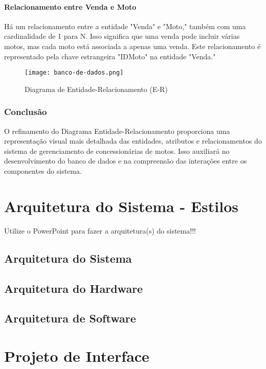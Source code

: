 \paragraph{Relacionamento entre Venda e Moto}

Há um relacionamento entre a entidade "Venda" e "Moto," também com uma cardinalidade de 1 para N. Isso significa que uma venda pode incluir várias motos, mas cada moto está associada a apenas uma venda. Este relacionamento é representado pela chave estrangeira "IDMoto" na entidade "Venda."

\begin{figure}[h]
	\centering
	\texttt{[image: banco-de-dados.png]}
	\caption{Diagrama de Entidade-Relacionamento (E-R)}
	\label{fig:Diagrama de Banco de Dados}
\end{figure}

\subsubsection{Conclusão}

O refinamento do Diagrama Entidade-Relacionamento proporciona uma representação visual mais detalhada das entidades, atributos e relacionamentos do sistema de gerenciamento de concessionárias de motos. Isso auxiliará no desenvolvimento do banco de dados e na compreensão das interações entre os componentes do sistema.


\section{Arquitetura do Sistema - Estilos}

    Utilize o PowerPoint para fazer a arquitetura(s) do sistema!!!

    \subsection{Arquitetura do Sistema}



    \subsection{Arquitetura do Hardware}


    \subsection{Arquitetura de Software}


\section{Projeto de Interface}


